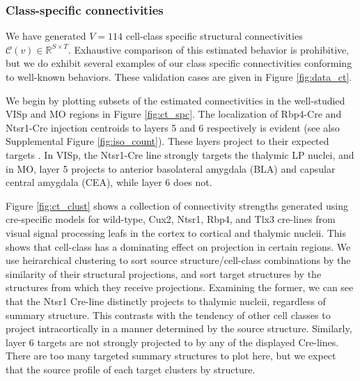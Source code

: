\newpage
\subsubsection{Class-specific connectivities}

We have generated $V = 114$ cell-class specific structural connectivities $\mathcal C(v) \in \mathbb R^{S \times T}$.
Exhaustive comparison of this estimated behavior is prohibitive, but we do exhibit several examples of our class specific connectivities conforming to well-known behaviors.
These validation cases are given in Figure \ref{fig:data_ct}.

We begin by plotting subsets of the estimated connectivities in the well-studied VISp and MO regions in Figure \ref{fig:ct_spc}.
The localization of Rbp4-Cre and Ntsr1-Cre injection centroids to layers 5 and 6 respectively is evident (see also Supplemental Figure \ref{fig:iso_count}). 
These layers project to their expected targets \citet{Jeong2016-dc}.
In VISp, the Ntsr1-Cre line strongly targets the thalymic LP nuclei, and in MO, layer 5 projects to anterior basolateral amygdala (BLA) and capsular central amygdala (CEA), while layer 6 does not.

Figure \ref{fig:ct_clust} shows a collection of connectivity strengths generated using cre-specific models for wild-type, Cux2, Ntsr1, Rbp4, and Tlx3 cre-lines from visual signal processing leafs in the cortex to cortical and thalymic nucleii.
This shows that cell-class has a dominating effect on projection in certain regions.
We use heirarchical clustering to sort source structure/cell-class combinations by the similarity of their structural projections, and sort target structures by the structures from which they receive projections.
Examining the former, we can see that the Ntsr1 Cre-line distinctly projects to thalymic nucleii, regardless of summary structure.
This contrasts with the tendency of other cell classes to project intracortically in a manner determined by the source structure.
Similarly, layer 6 targets are not strongly projected to by any of the displayed Cre-lines.
There are too many targeted summary structures to plot here, but we expect that the source profile of each target clusters by structure.

\newpage

